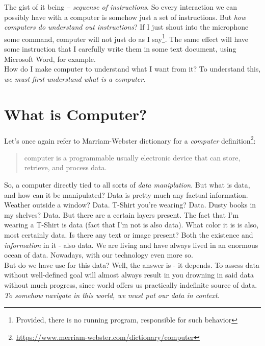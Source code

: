 \documentclass{article}
\begin{document}
        The gist of it being -- \emph{sequense of instructions}. So every interaction we can possibly have with a computer is somehow just a set of instructions. But \emph{how computers
        do understand out instructions}? If I just shout into the microphone some command, computer will not just do as I say\footnote{Provided, there is no running program, responsible for such behavior}.
        The same effect will have some instruction that I carefully write them in some text document, using Microsoft Word, for example.
        \\ 
        How do I make computer to understand what I want from it? To understand this, \emph{we must first understand what is a computer}.

    \section{What is Computer?}

        Let's once again refer to Marriam-Webster dictionary for a \emph{computer} definition\footnote{\href{https://www.merriam-webster.com/dictionary/computer}{https://www.merriam-webster.com/dictionary/computer}}:

        \begin{quote}
            computer is a programmable usually electronic device that can store, retrieve, and process data.
        \end{quote}

        So, a computer directly tied to all sorts of \emph{data maniplation}. But what is data, and how can it be manipulated? Data is pretty much any factual information.
        Weather outside a window? Data. T-Shirt you're wearing? Data. Dusty books in my shelves? Data. But there are a certain layers present. The fact that I'm wearing a T-Shirt 
        is data (fact that I'm not is also data). What color it is is also, most certainly data. Is there any text or image present? 
        Both the existence and \emph{information} in it - also data. We are living and have always lived in an enormous ocean of data. Nowadays, with our technology even more so.
        \\
        But do we have use for this data? Well, the answer is - it depends. To assess data without well-defined goal will almost always result in you drowning in said data without much progress,
        since world offers us practically indefinite source of data.
        \\
        \emph{To somehow navigate in this world, we must put our data in context.}
        \\

    
\end{document}
